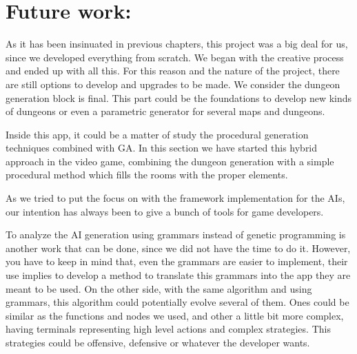\section{Future work:}
As it has been insinuated in previous chapters, this project was a big deal for us, since we developed everything from scratch. We began with the creative process and ended up with all this. For this reason and the nature of the project, there are still options to develop and upgrades to be made. We consider the dungeon generation block is final. This part could be the foundations to develop new kinds of dungeons or even a parametric generator for several maps and dungeons.\par
Inside this app, it could be a matter of study the procedural generation techniques combined with GA. In this section we have started this hybrid approach in the video game, combining the dungeon generation with a simple procedural method which fills the rooms with the proper elements.\par
As we tried to put the focus on with the framework implementation for the AIs, our intention has always been to give a bunch of tools for game developers.\par
To analyze the AI generation using grammars instead of genetic programming is another work that can be done, since we did not have the time to do it. However, you have to keep in mind that, even the grammars are easier to implement, their use implies to develop a method to translate this grammars into the app they are meant to be used. On the other side, with the same algorithm and using grammars, this algorithm could potentially evolve several of them. Ones could be similar as the functions and nodes we used, and other a little bit more complex,  having terminals representing high level actions and complex strategies. This strategies could be offensive, defensive or whatever the developer wants.\par
